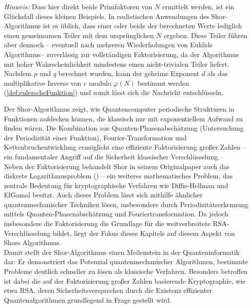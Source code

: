 \begin{enumerate}
\textit{Hinweis:} Dass hier direkt beide Primfaktoren von \( N \) ermittelt werden, ist ein Glücksfall dieses kleinen Beispiels. In realistischen Anwendungen des Shor-Algorithmus ist es üblich, dass einer oder beide der berechneten Werte lediglich einen gemeinsamen Teiler mit dem ursprünglichen \( N \) ergeben. Diese Teiler führen aber dennoch – eventuell nach mehreren Wiederholungen von Euklids Algorithmus– zuverlässig zur vollständigen Faktorisierung, da der Algorithmus mit hoher Wahrscheinlichkeit mindestens einen nicht-trivialen Teiler liefert.\\

Nachdem \( p \) und \( q \) berechnet wurden, kann der geheime Exponent \( d \) als das multiplikative Inverse von \( e \) modulo \( \varphi(N) \) bestimmt werden (\ref{def:eulerscheFunktion}) und somit lässt sich die Nachricht entschlüsseln.

\end{enumerate}

Der Shor-Algorithmus zeigt, wie Quantencomputer periodische Strukturen in Funktionen aufdecken können, die klassisch nur mit exponentiellem Aufwand zu finden wären. Die Kombination aus Quanten-Phasenabschätzung (Untersuchung der Periodizität einer Funktion), Fourier-Transformati\-on und Kettenbruchentwicklung ermöglicht eine effiziente Faktorisierung großer Zahlen – ein fundamentaler Angriff auf die Sicherheit klassischer Verschlüsselung.\\

Neben der Faktorisierung behandelt Shor in seinem Originalpaper auch das diskrete Logarithmusproblem (\cite[19-24]{shor_polynomial-time_1994})
 – ein weiteres mathematisches Problem, das zentrale Bedeutung für kryptographische Verfahren wie Diffie-Hellman und ElGamal besitzt. Auch dieses Problem lässt sich mithilfe ähnlicher quantenmechanischer Techniken lösen, insbesondere durch Periodizitätserkennung mittels Quanten-Phasenabschätzung und Fouriertransformation. Da jedoch insbesondere die Faktorisierung die Grundlage für die weitverbreitete RSA-Verschlüsselung bildet, liegt der Fokus dieses Kapitels auf diesem Aspekt von Shors Algorithmus.\\

Damit stellt der Shor-Algorithmus einen Meilenstein in der Quanteninformatik dar: Er demonstriert das Potenzial quantenmechanischer Algorithmen, bestimmte Probleme deutlich schneller zu lösen als klassische Verfahren. Besonders betroffen ist dabei die auf der Faktorisierung großer Zahlen basierende Kryptographie, wie etwa RSA, deren Sicherheitsversprechen durch die Existenz effizienter Quantenalgorithmen grundlegend in Frage gestellt wird.\\

